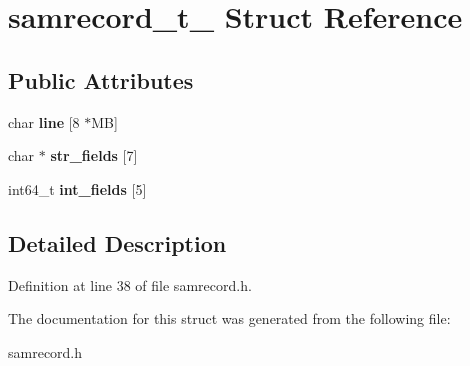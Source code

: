 \hypertarget{structsamrecord__t__}{\section{samrecord\-\_\-t\-\_\- Struct Reference}
\label{structsamrecord__t__}
}
\subsection*{Public Attributes}
\begin{DoxyCompactItemize}
\item 
\hypertarget{structsamrecord__t___a18bf8cdd5ef843a837cce6ac58ae4901}{char {\bfseries line} \mbox{[}8 $\ast$M\-B\mbox{]}}\label{structsamrecord__t___a18bf8cdd5ef843a837cce6ac58ae4901}

\item 
\hypertarget{structsamrecord__t___aec7d8a72c662381ee112839bd82c639a}{char $\ast$ {\bfseries str\-\_\-fields} \mbox{[}7\mbox{]}}\label{structsamrecord__t___aec7d8a72c662381ee112839bd82c639a}

\item 
\hypertarget{structsamrecord__t___ad758294191d742e6273a7c1c1d62712f}{int64\-\_\-t {\bfseries int\-\_\-fields} \mbox{[}5\mbox{]}}\label{structsamrecord__t___ad758294191d742e6273a7c1c1d62712f}

\end{DoxyCompactItemize}


\subsection{Detailed Description}


Definition at line 38 of file samrecord.\-h.



The documentation for this struct was generated from the following file\-:\begin{DoxyCompactItemize}
\item 
samrecord.\-h\end{DoxyCompactItemize}
